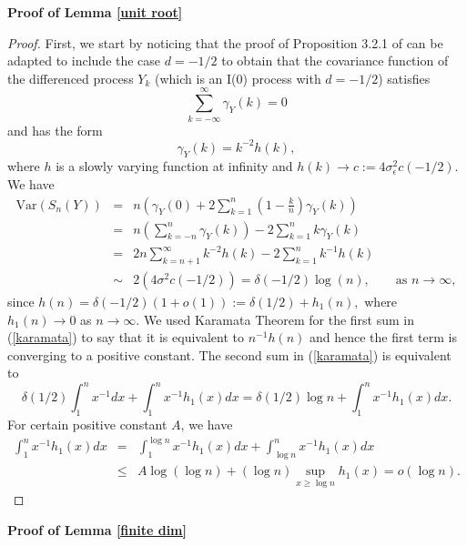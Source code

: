 \documentclass[12pt]{article}
\begin{document}
{\bf Proof of Lemma \ref{unit root}}
\begin{proof}
First, we start by noticing that the proof of Proposition 3.2.1 of \cite{MR2977317} can be adapted to include the case $d=-1/2$ to obtain that the covariance function of the differenced process $Y_k$ (which is an I(0) process with $d=-1/2$) satisfies
$$
\sum_{k=-\infty}^\infty\gamma_Y(k)=0
$$
and has the form
$$
\gamma_Y(k)=k^{-2}h(k),
$$
where $h$ is a slowly varying function at infinity and $h(k)\to c:=4\sigma^2_\epsilon c(-1/2)$.
We have
\begin{eqnarray}
\textrm{Var}(S_n(Y))&=&n\left(\gamma_Y(0)+2\sum_{k=1}^n\left(1-\frac{k}{n}\right)\gamma_Y(k)\right)\nonumber\\
&=&n\left(\sum_{k=-n}^n\gamma_Y(k)\right)-2\sum_{k=1}^nk\gamma_Y(k)\nonumber\\
&=&2n\sum_{k=n+1}^\infty k^{-2}h(k)-2\sum_{k=1}^nk^{-1}h(k)\label{karamata}\\
&\sim&2(4\sigma^2c(-1/2))=\delta(-1/2)\log(n),\qquad\textrm{as }n\to\infty,\nonumber
\end{eqnarray}
since $h(n)=\delta(-1/2)\left(1+o(1)\right):=\delta(1/2)+h_1(n),$ where $h_1(n)\to0$ as $n\to\infty$.  We used Karamata Theorem for the first sum in  (\ref{karamata}) to say that it is equivalent to $n^{-1}h(n)$ and hence the first term  is converging to a positive constant. The second sum in (\ref{karamata}) is equivalent to
$$
\delta(1/2)\int_1^nx^{-1}dx+\int_1^nx^{-1}h_1(x)dx=\delta(1/2)\log n+\int_1^nx^{-1}h_1(x)dx.
$$
For  certain positive constant $A$, we have
\begin{eqnarray*}
    \int_1^nx^{-1}h_1(x)dx&=&\int_1^{\log n}x^{-1}h_1(x)dx+\int_{\log n}^nx^{-1}h_1(x)dx\\
    &\le& A\log(\log n)+(\log n)\underset{x\ge \log n}{\sup}h_1(x)=o(\log n).
\end{eqnarray*}
\end{proof} 
{\bf Proof of Lemma \ref{finite dim}}
\end{document}
